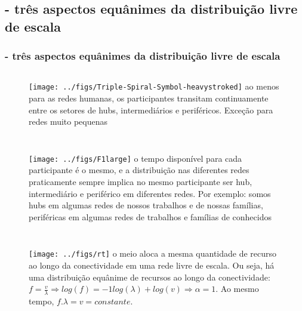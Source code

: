 \documentclass[10pt]{beamer}
\begin{document}
\subsection{- três aspectos equânimes da distribuição livre de escala}
\begin{frame}
\frametitle{- três aspectos equânimes da distribuição livre de escala}
\begin{figure}
	\begin{columns}
		\texttt{[image: ../figs/Triple-Spiral-Symbol-heavystroked]}
ao menos para as redes humanas, os participantes transitam continuamente entre os setores de hubs, intermediários e periféricos. Exceção para redes muito pequenas
	\end{columns}
\end{figure}



\begin{figure}
	\begin{columns}
		\column{.2\textwidth}
		\texttt{[image: ../figs/F1large]}
		\column{.9\linewidth}
o tempo disponível para cada participante é o mesmo, e a distribuição nas diferentes redes praticamente sempre implica no mesmo participante ser hub, intermediário e periférico em diferentes redes. Por exemplo: somos hubs em algumas redes de nossos trabalhos e de nossas famílias, periféricas em algumas redes de trabalhos e famílias de conhecidos
	\end{columns}
\end{figure}



\begin{figure}
	\begin{columns}
		\column{.3\textwidth}
		\texttt{[image: ../figs/rt]}
		\column{.7\linewidth}
		o meio aloca a mesma quantidade de recurso ao longo da conectividade em uma rede livre de escala. Ou seja, há uma distribuição equânime de recursos ao longo da conectividade: $f=\frac{v}{\lambda} \Rightarrow log(f)=-1 log(\lambda) + log(v) \Rightarrow \alpha=1$. Ao mesmo tempo, $f . \lambda = v = constante$.
		\label{fig:example right}
	\end{columns}
\end{figure}

\end{frame}

\end{document}
